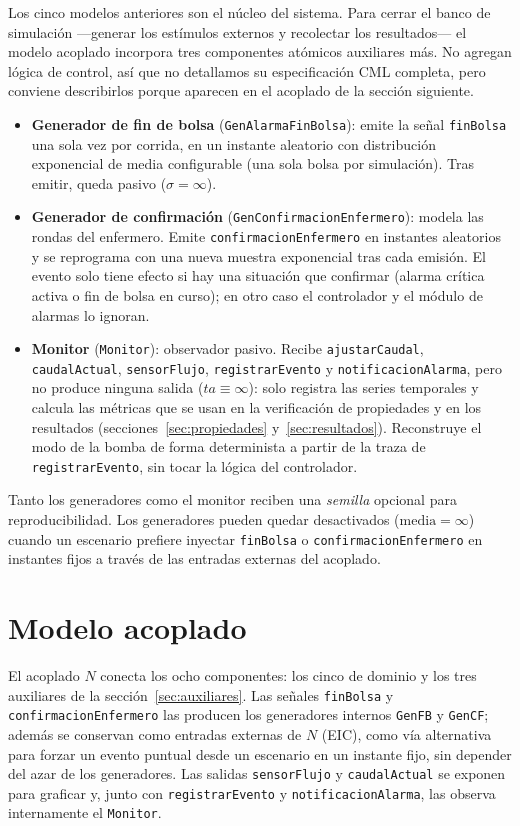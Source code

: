 \documentclass[11pt,a4paper]{article}
\begin{document}
Los cinco modelos anteriores son el núcleo del sistema. Para cerrar el banco de simulación —generar los estímulos externos y recolectar los resultados— el modelo acoplado incorpora tres componentes atómicos auxiliares más. No agregan lógica de control, así que no detallamos su especificación CML completa, pero conviene describirlos porque aparecen en el acoplado de la sección siguiente.

\begin{itemize}
  \item \textbf{Generador de fin de bolsa} (\texttt{GenAlarmaFinBolsa}): emite la señal \texttt{finBolsa} una sola vez por corrida, en un instante aleatorio con distribución exponencial de media configurable (una sola bolsa por simulación). Tras emitir, queda pasivo ($\sigma = \infty$).
  \item \textbf{Generador de confirmación} (\texttt{GenConfirmacionEnfermero}): modela las rondas del enfermero. Emite \texttt{confirmacionEnfermero} en instantes aleatorios y se reprograma con una nueva muestra exponencial tras cada emisión. El evento solo tiene efecto si hay una situación que confirmar (alarma crítica activa o fin de bolsa en curso); en otro caso el controlador y el módulo de alarmas lo ignoran.
  \item \textbf{Monitor} (\texttt{Monitor}): observador pasivo. Recibe \texttt{ajustarCaudal}, \texttt{caudalActual}, \texttt{sensorFlujo}, \texttt{registrarEvento} y \texttt{notificacionAlarma}, pero no produce ninguna salida ($ta \equiv \infty$): solo registra las series temporales y calcula las métricas que se usan en la verificación de propiedades y en los resultados (secciones~\ref{sec:propiedades} y~\ref{sec:resultados}). Reconstruye el modo de la bomba de forma determinista a partir de la traza de \texttt{registrarEvento}, sin tocar la lógica del controlador.
\end{itemize}

\noindent Tanto los generadores como el monitor reciben una \emph{semilla} opcional para reproducibilidad. Los generadores pueden quedar desactivados ($\text{media} = \infty$) cuando un escenario prefiere inyectar \texttt{finBolsa} o \texttt{confirmacionEnfermero} en instantes fijos a través de las entradas externas del acoplado.

\section{Modelo acoplado}

El acoplado $N$ conecta los ocho componentes: los cinco de dominio y los tres auxiliares de la sección~\ref{sec:auxiliares}. Las señales \texttt{finBolsa} y \texttt{confirmacionEnfermero} las producen los generadores internos \texttt{GenFB} y \texttt{GenCF}; además se conservan como entradas externas de $N$ (EIC), como vía alternativa para forzar un evento puntual desde un escenario en un instante fijo, sin depender del azar de los generadores. Las salidas \texttt{sensorFlujo} y \texttt{caudalActual} se exponen para graficar y, junto con \texttt{registrarEvento} y \texttt{notificacionAlarma}, las observa internamente el \texttt{Monitor}.
\end{document}
